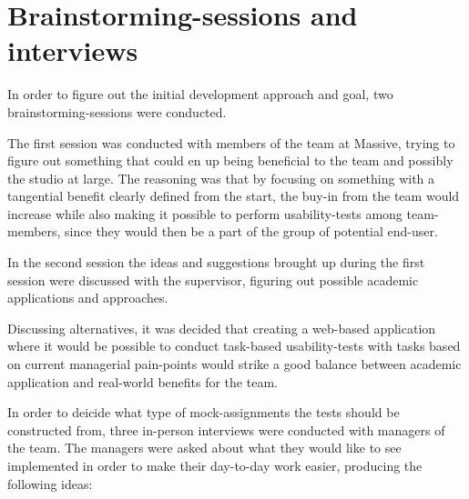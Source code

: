 \section{Brainstorming-sessions and interviews}{\label{label_sectionIdeas}



  In order to figure out the initial development approach and goal, two
  brainstorming-sessions were conducted.

  The first session was conducted with members of the team at Massive, trying
  to figure out something that could en up being beneficial to the team and
  possibly the studio at large. The reasoning was that by focusing on something
  with a tangential benefit clearly defined from the start, the buy-in
  from the team would increase while also making it possible to perform
  usability-tests among team-members, since they would then be a part of the
  group of potential end-user.

  In the second session the ideas and suggestions brought up during the first
  session were discussed with the supervisor, figuring out possible academic
  applications and approaches.


  Discussing alternatives, it was decided that creating a web-based application
  where it would be possible to conduct task-based usability-tests with tasks
  based on current managerial pain-points would strike a good balance between
  academic application and real-world benefits for the team.

  In order to deicide what type of mock-assignments the tests should be
  constructed from, three in-person interviews were conducted with managers of
  the team. The managers were asked about what they would like to see
  implemented in order to make their day-to-day work easier, producing the
  following ideas:



  \newcommand{\ideaOne}{%
    An easy way to see if a co-worker is assigned more work than they have
    available hours.%
  }

}
